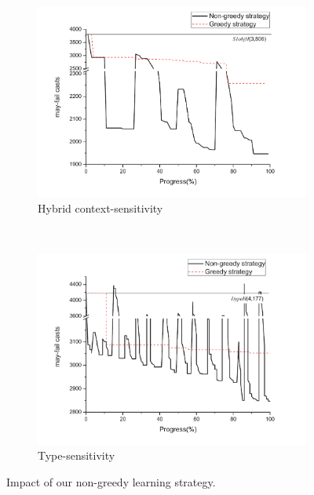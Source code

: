 \begin{figure}[t]
  \centering
  \begin{subfigure}[b]{.45\textwidth}
  \includegraphics[width=\textwidth]{ContextTunneling/figures/sobj_ours_greedy.pdf}
  \caption{Hybrid context-sensitivity}
  \label{fig:greedy_sobj}
  \end{subfigure}
  ~
  \begin{subfigure}[b]{.45\textwidth}
  \includegraphics[width=\textwidth]{ContextTunneling/figures/type_ours_greedy.pdf}
  \caption{Type-sensitivity}
  \label{fig:greedy_type}
  \end{subfigure}
  \caption{Impact of our non-greedy learning strategy.
}
  \label{fig:greedy}
\end{figure}


